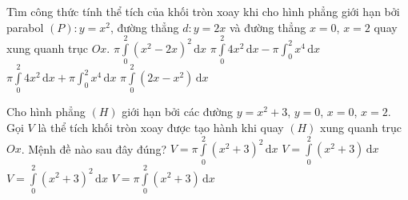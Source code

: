 \begin{ex}%
Tìm công thức tính thể tích của khối tròn xoay khi cho hình phẳng giới hạn bởi parabol $(P)\colon y=x^2$, đường thẳng $d\colon y=2 x$ và đường thẳng $x=0$, $x=2$ quay xung quanh trục $O x$.
\choice
{$\pi \displaystyle\int\limits_0^2\left(x^2-2 x\right)^2 \mathrm{\,d} x$}
{\True $\pi \displaystyle\int\limits_0^2 4 x^2 \mathrm{\,d} x-\pi \int_0^2 x^4 \mathrm{\,d} x$}
{ $\pi \displaystyle\int\limits_0^2 4 x^2 \mathrm{\,d} x+\pi \int_0^2 x^4 \mathrm{\,d} x$}
{$\pi \displaystyle\int\limits_0^2\left(2 x-x^2\right) \mathrm{\,d} x$}
\end{ex}

\begin{ex}%
 Cho hình phẳng $(H)$ giới hạn bởi các đường $y=x^2+3$, $y=0$, $x=0$, $x=2$. Gọi $V$ là thể tích khối tròn xoay được tạo hành khi quay $ (H) $ xung quanh trục $ Ox $. Mệnh đề nào sau đây đúng?
 \choice
 {\True $ V=\pi \displaystyle\int\limits_0^2 \left(x^2+3\right)^2 \mathrm{\,d}x $}
 {$ V=\displaystyle\int\limits_0^2 \left(x^2+3\right)\mathrm{\,d}x $}
 {$ V=\displaystyle\int\limits_0^2 \left(x^2+3\right)^2 \mathrm{\,d}x $}
 {$ V=\pi \displaystyle\int\limits_0^2 \left(x^2+3\right) \mathrm{\,d}x $}
\end{ex}